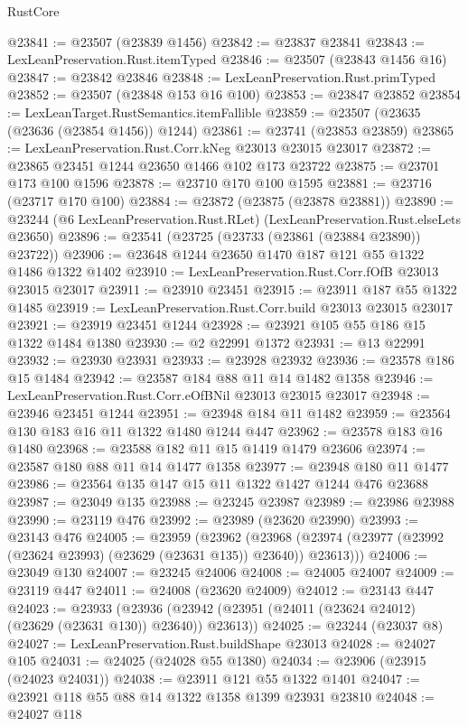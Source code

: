 \begin{lexlean}{RustCore}
\begin{coremodule}
@23841 := @23507 (@23839 @1456)
@23842 := @23837 @23841
@23843 := LexLeanPreservation.Rust.itemTyped
@23846 := @23507 (@23843 @1456 @16)
@23847 := @23842 @23846
@23848 := LexLeanPreservation.Rust.primTyped
@23852 := @23507 (@23848 @153 @16 @100)
@23853 := @23847 @23852
@23854 := LexLeanTarget.RustSemantics.itemFallible
@23859 := @23507 (@23635 (@23636 (@23854 @1456)) @1244)
@23861 := @23741 (@23853 @23859)
@23865 := LexLeanPreservation.Rust.Corr.kNeg @23013 @23015 @23017
@23872 := @23865 @23451 @1244 @23650 @1466 @102 @173 @23722
@23875 := @23701 @173 @100 @1596
@23878 := @23710 @170 @100 @1595
@23881 := @23716 (@23717 @170 @100)
@23884 := @23872 (@23875 (@23878 @23881))
@23890 := @23244 (@6 LexLeanPreservation.Rust.RLet) (LexLeanPreservation.Rust.elseLets @23650)
@23896 := @23541 (@23725 (@23733 (@23861 (@23884 @23890)) @23722))
@23906 := @23648 @1244 @23650 @1470 @187 @121 @55 @1322 @1486 @1322 @1402
@23910 := LexLeanPreservation.Rust.Corr.fOfB @23013 @23015 @23017
@23911 := @23910 @23451
@23915 := @23911 @187 @55 @1322 @1485
@23919 := LexLeanPreservation.Rust.Corr.build @23013 @23015 @23017
@23921 := @23919 @23451 @1244
@23928 := @23921 @105 @55 @186 @15 @1322 @1484 @1380
@23930 := @2 @22991 @1372
@23931 := @13 @22991
@23932 := @23930 @23931
@23933 := @23928 @23932
@23936 := @23578 @186 @15 @1484
@23942 := @23587 @184 @88 @11 @14 @1482 @1358
@23946 := LexLeanPreservation.Rust.Corr.eOfBNil @23013 @23015 @23017
@23948 := @23946 @23451 @1244
@23951 := @23948 @184 @11 @1482
@23959 := @23564 @130 @183 @16 @11 @1322 @1480 @1244 @447
@23962 := @23578 @183 @16 @1480
@23968 := @23588 @182 @11 @15 @1419 @1479 @23606
@23974 := @23587 @180 @88 @11 @14 @1477 @1358
@23977 := @23948 @180 @11 @1477
@23986 := @23564 @135 @147 @15 @11 @1322 @1427 @1244 @476 @23688
@23987 := @23049 @135
@23988 := @23245 @23987
@23989 := @23986 @23988
@23990 := @23119 @476
@23992 := @23989 (@23620 @23990)
@23993 := @23143 @476
@24005 := @23959
    (@23962
      (@23968 (@23974 (@23977 (@23992 (@23624 @23993) (@23629 (@23631 @135)) @23640)) @23613)))
@24006 := @23049 @130
@24007 := @23245 @24006
@24008 := @24005 @24007
@24009 := @23119 @447
@24011 := @24008 (@23620 @24009)
@24012 := @23143 @447
@24023 := @23933
    (@23936 (@23942 (@23951 (@24011 (@23624 @24012) (@23629 (@23631 @130)) @23640)) @23613))
@24025 := @23244 (@23037 @8)
@24027 := LexLeanPreservation.Rust.buildShape @23013
@24028 := @24027 @105
@24031 := @24025 (@24028 @55 @1380)
@24034 := @23906 (@23915 (@24023 @24031))
@24038 := @23911 @121 @55 @1322 @1401
@24047 := @23921 @118 @55 @88 @14 @1322 @1358 @1399 @23931 @23810
@24048 := @24027 @118

\end{coremodule}
\end{lexlean}
